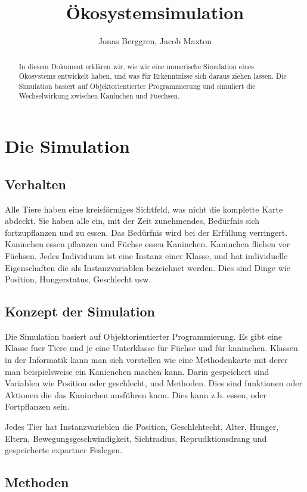 \documentclass[12pt]{article}
\author{{\Large Jonas Berggren, Jacob Maxton}}
\title{{\myfont Ökosystemsimulation}}
\begin{document}
\maketitle
\tableofcontents
\newpage
\begin{abstract}
In diesem Dokument erklären wir, wie wir eine numerische Simulation eines
	Ökosystems entwickelt haben, und was für Erkenntnisse sich daraus ziehen lassen.
Die Simulation basiert auf Objektorientierter Programmierung und simuliert die Wechselwirkung zwischen Kaninchen und Fuechsen.
\end{abstract}

\section{Die Simulation}
\subsection{Verhalten}
Alle Tiere haben eine kreisförmiges Sichtfeld, was nicht die komplette Karte abdeckt.
Sie haben alle ein, mit der Zeit zunehmendes, Bedürfnis sich fortzupflanzen und zu essen.
Das Bedürfnis wird bei der Erfüllung verringert.
Kaninchen essen pflanzen und Füchse essen Kaninchen.
Kaninchen fliehen vor Füchsen.
Jedes Individuum ist eine Instanz einer Klasse, und hat individuelle
Eigenschaften die als Instanzvariablen bezeichnet werden.
Dies sind Dinge wie Position, Hungerstatus, Geschlecht usw.

\subsection{Konzept der Simulation}
Die Simulation basiert auf Objektorientierter Programmierung.
Es gibt eine Klasse fuer Tiere und je eine Unterklasse für Füchse und für kaninchen.
Klassen in der Informatik kann man sich vorstellen wie eine Methodenkarte mit derer man beispielsweise ein Kanienchen machen kann.
Darin gespeichert sind Variablen wie Position oder geschlecht, und Methoden.
Dies sind funktionen oder Aktionen die das Kaninchen ausführen kann.
Dies kann z.b. essen, oder Fortpflanzen sein.

Jedes Tier hat Instanzvarieblen die Position, Geschlchtecht, Alter, Hunger, Eltern, Bewegungsgeschwindigkeit, Sichtradius, Reprudktionsdrang und gespeicherte expartner Feslegen.
\subsection{Methoden}
\end{document}
